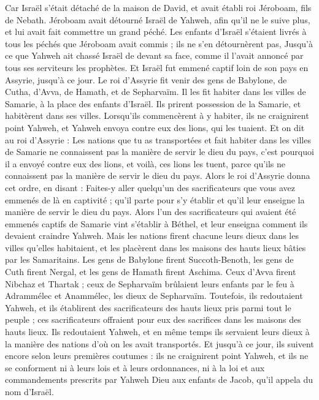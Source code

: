 \begin{multicols}{2}
Car Israël s’était détaché de la maison de David, et avait établi roi Jéroboam, fils de Nebath. Jéroboam avait détourné Israël de Yahweh, afin qu’il ne le suive plus, et lui avait fait commettre un grand péché.
Les enfants d’Israël s’étaient livrés à tous les péchés que Jéroboam avait commis ; ils ne s’en détournèrent pas,
Jusqu’à ce que Yahweh ait chassé Israël de devant sa face, comme il l’avait annoncé par tous ses serviteurs les prophètes. Et Israël fut emmené captif loin de son pays en Assyrie, jusqu’à ce jour.
Le roi d’Assyrie fit venir des gens de Babylone, de Cutha, d’Avva, de Hamath, et de Sepharvaïm. Il les fit habiter dans les villes de Samarie, à la place des enfants d’Israël. Ils prirent possession de la Samarie, et habitèrent dans ses villes.
Lorsqu’ils commencèrent à y habiter, ils ne craignirent point Yahweh, et Yahweh envoya contre eux des lions, qui les tuaient.
Et on dit au roi d’Assyrie : Les nations que tu as transportées et fait habiter dans les villes de Samarie ne connaissent pas la manière de servir le dieu du pays, c’est pourquoi il a envoyé contre eux des lions, et voilà, ces lions les tuent, parce qu’ils ne connaissent pas la manière de servir le dieu du pays.
Alors le roi d’Assyrie donna cet ordre, en disant : Faites-y aller quelqu’un des sacrificateurs que vous avez emmenés de là en captivité ; qu’il parte pour s’y établir et qu’il leur enseigne la manière de servir le dieu du pays.
Alors l’un des sacrificateurs qui avaient été emmenés captifs de Samarie vint s’établir à Béthel, et leur enseigna comment ils devaient craindre Yahweh.
Mais les nations firent chacune leurs dieux dans les villes qu’elles habitaient, et les placèrent dans les maisons des hauts lieux bâties par les Samaritains.
Les gens de Babylone firent Succoth-Benoth, les gens de Cuth firent Nergal, et les gens de Hamath firent Aschima.
Ceux d’Avva firent Nibchaz et Thartak ; ceux de Sepharvaïm brûlaient leurs enfants par le feu à Adrammélec et Anammélec, les dieux de Sepharvaïm.
Toutefois, ils redoutaient Yahweh, et ils établirent des sacrificateurs des hauts lieux pris parmi tout le peuple ; ces sacrificateurs offraient pour eux des sacrifices dans les maisons des hauts lieux.
Ils redoutaient Yahweh, et en même temps ils servaient leurs dieux à la manière des nations d’où on les avait transportés.
Et jusqu’à ce jour, ils suivent encore selon leurs premières coutumes : ils ne craignirent point Yahweh, et ils ne se conforment ni à leurs lois et à leurs ordonnances, ni à la loi et aux commandements prescrits par Yahweh Dieu aux enfants de Jacob, qu’il appela du nom d’Israël.

\end{multicols}
